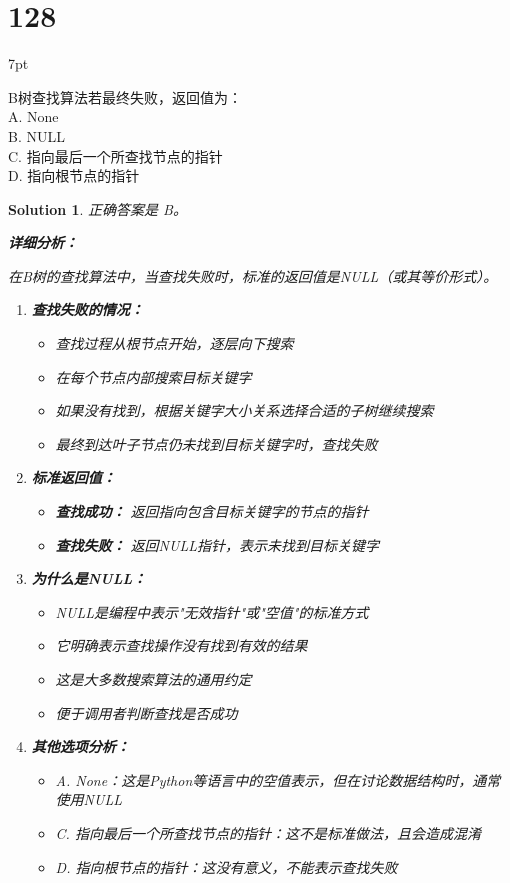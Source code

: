 \documentclass[UTF8]{report}
\newtheorem{solution}{Solution}
\theoremstyle{MyLineTheoremStyle} %
\theoremstyle{MyBlockTheoremStyle} %
\theoremstyle{MySubsubsectionStyle} %
\newenvironment{graybox}{%
        \def\FrameCommand{%
        \hspace{1pt}%
        {\color{gray}\small \vrule width 2pt}%
        {\color{graybox_color}\vrule width 4pt}%
        \colorbox{graybox_color}%
        }%
        \MakeFramed{\advance\hsize-\width\FrameRestore}%
        \noindent\hspace{-4.55pt}%
        \begin{adjustwidth}{}{7pt}%
        \vspace{2pt}\vspace{2pt}%
        }
        {%
        \vspace{2pt}\end{adjustwidth}\endMakeFramed%
        }
\begin{document}
\section*{128}
\begin{graybox}
B树查找算法若最终失败，返回值为：\\
A. None\\
B. NULL\\
C. 指向最后一个所查找节点的指针\\
D. 指向根节点的指针
\end{graybox}

\begin{solution}
正确答案是 B。

\textbf{详细分析：}

在B树的查找算法中，当查找失败时，标准的返回值是NULL（或其等价形式）。

\begin{enumerate}
    \item \textbf{查找失败的情况：}
    \begin{itemize}
        \item 查找过程从根节点开始，逐层向下搜索
        \item 在每个节点内部搜索目标关键字
        \item 如果没有找到，根据关键字大小关系选择合适的子树继续搜索
        \item 最终到达叶子节点仍未找到目标关键字时，查找失败
    \end{itemize}

    \item \textbf{标准返回值：}
    \begin{itemize}
        \item \textbf{查找成功：} 返回指向包含目标关键字的节点的指针
        \item \textbf{查找失败：} 返回NULL指针，表示未找到目标关键字
    \end{itemize}

    \item \textbf{为什么是NULL：}
    \begin{itemize}
        \item NULL是编程中表示"无效指针"或"空值"的标准方式
        \item 它明确表示查找操作没有找到有效的结果
        \item 这是大多数搜索算法的通用约定
        \item 便于调用者判断查找是否成功
    \end{itemize}

    \item \textbf{其他选项分析：}
    \begin{itemize}
        \item A. None：这是Python等语言中的空值表示，但在讨论数据结构时，通常使用NULL
        \item C. 指向最后一个所查找节点的指针：这不是标准做法，且会造成混淆
        \item D. 指向根节点的指针：这没有意义，不能表示查找失败
    \end{itemize}
\end{enumerate}


\end{solution}
\end{document}
